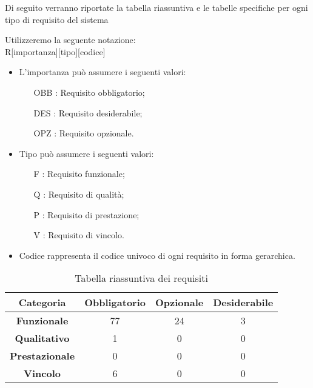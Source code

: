 Di seguito verranno riportate la tabella riassuntiva e le tabelle specifiche per ogni tipo di requisito del sistema 

Utilizzeremo la seguente notazione:\\
R[importanza][tipo][codice]

\begin{itemize}
	\item L'importanza può assumere i seguenti valori:
	\begin{itemize}
		\item [OBB]: Requisito obbligatorio;
		\item [DES]: Requisito desiderabile;
		\item [OPZ]: Requisito opzionale.
	\end{itemize}
	
	\item Tipo può assumere i seguenti valori:
	\begin{itemize}
		\item [F] : Requisito funzionale;
		\item [Q] : Requisito di qualità;
		\item [P] : Requisito di prestazione;
		\item [V] : Requisito di vincolo.
	\end{itemize}
	
	\item Codice rappresenta il codice univoco di ogni requisito in forma gerarchica.
\end{itemize}

	\begin{table}[h]
		\centering
		\begin{tabular}{|c|c|c|c|}
			\toprule
			
			\textbf{Categoria} & \textbf{Obbligatorio} & \textbf{Opzionale} & \textbf{Desiderabile} \\
			
			\midrule
			\textbf{Funzionale} & 77 & 24 & 3 \\ \midrule
			\textbf{Qualitativo} & 1 & 0 & 0 \\  \midrule
			\textbf{Prestazionale} & 0 & 0 & 0 \\ \midrule
			\textbf{Vincolo} & 6 & 0 & 0  \\ \midrule
			
			\bottomrule
			
		\end{tabular}
		\caption{Tabella riassuntiva dei requisiti}
		
	\end{table}
	\newpage


\newpage


\newpage


\newpage


\newpage

%

